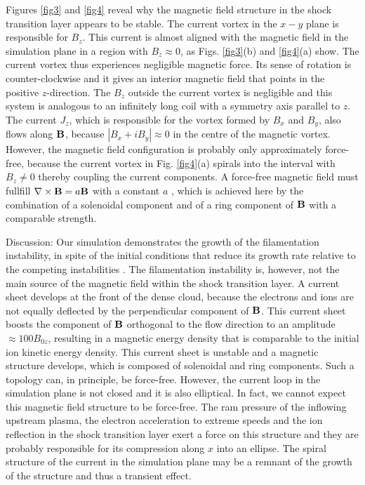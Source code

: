 \documentclass[twocolumn,showpacs,preprintnumbers,amsmath,amssymb]{revtex4}
\begin{document}
Figures \ref{fig3} and \ref{fig4} reveal why the magnetic field structure in the shock transition 
layer appears to be stable. The current vortex in the $x-y$ plane is responsible for $B_z$. This 
current is almost aligned with the magnetic field in the simulation plane in a region with 
$B_z \approx 0$, as Figs. \ref{fig3}(b) and \ref{fig4}(a) show. The current vortex thus experiences 
negligible magnetic force. Its sense of rotation is counter-clockwise and it gives an interior 
magnetic field that points in the positive $z$-direction. The $B_z$ outside the current vortex is 
negligible and this system is analogous to an infinitely long coil with a symmetry axis parallel 
to $z$. The current $J_z$, which is responsible for the vortex formed by $B_x$ and $B_y$, also flows 
along ${\bf B}$, because $|B_x + iB_y| \approx 0$ in the centre of the magnetic vortex. However,
the magnetic field configuration is probably only approximately force-free, because the current 
vortex in Fig. \ref{fig4}(a) spirals into the interval with $B_z \neq 0$ thereby coupling the
current components. A force-free magnetic field must fullfill $\nabla \times {\bf B} = a{\bf B}$ 
with a constant $a$ \cite{Old,New}, which is achieved here by the combination of a solenoidal 
component and of a ring component of ${\bf B}$ with a comparable strength.

Discussion: Our simulation demonstrates the growth of the filamentation instability, in spite of
the initial conditions that reduce its growth rate relative to the competing instabilities
\cite{Dieckmann}. The filamentation instability is, however, not the main source of the magnetic 
field within the shock transition layer. A current sheet develops at the front of the dense cloud,
because the electrons and ions are not equally deflected by the perpendicular component of ${\bf B}$. 
This current sheet boosts the component of ${\bf B}$ orthogonal to the flow direction to an amplitude
$\approx 100 B_{0z}$, resulting in a magnetic energy density that is comparable to the initial ion 
kinetic energy density. This current sheet is unstable and a magnetic structure develops, which is 
composed of solenoidal and ring components. Such a topology can, in principle, be force-free. However, 
the current loop in the simulation plane is not closed and it is also elliptical. In fact, we cannot 
expect this magnetic field structure to be force-free. The ram pressure of the inflowing upstream 
plasma, the electron acceleration to extreme speeds and the ion reflection in the shock 
transition layer exert a force on this structure and they are probably responsible for its compression 
along $x$ into an ellipse. The spiral structure of the current in the simulation plane may be a remnant 
of the growth of the structure and thus a transient effect.   
\end{document}
